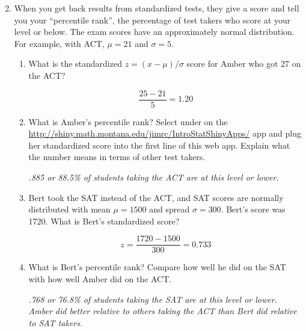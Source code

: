 \begin{enumerate}
\setcounter{enumi}{1}
  \item  When you get back results from standardized tests, they give
    a score and tell you your ``percentile rank'', the percentage
    of test takers who score at your level or below.  The exam scores have
    an approximately normal distribution.  For example, with ACT, $\mu
    = 21$ and $\sigma = 5$.
    \begin{enumerate}
    \item What is the standardized $z = (x-\mu)/\sigma$ score for
      Amber who got 27 on the ACT? 
\begin{students}
        \vspace{2cm}        
\end{students}
\begin{key}
  $$ \frac{25 - 21}{5} = 1.20$$
\end{key}
    \item What is Amber's percentile rank?  Select
       under  on the 
      \url{http://shiny.math.montana.edu/jimrc/IntroStatShinyApps/} 
      app and plug her standardized score  into
      the first line of this web app.  Explain what
      the number means in terms of other  test takers.  
\begin{students}
        \vspace{1cm}        
\end{students}

\begin{key}
 {\it .885 or 88.5\% of students taking the ACT are at this level or lower.}
\end{key}
   \item Bert took the SAT instead of the ACT, and
      SAT scores are normally distributed with mean $\mu = 1500$
     and spread $\sigma = 300$. Bert's score was  1720. What is Bert's
     standardized score?
\begin{students}
        \vspace{2cm}        
\end{students}
\begin{key}
  $$ z = \frac{1720 - 1500}{300} = 0.733$$
\end{key}
    \item What is Bert's percentile rank? Compare how well he did on
      the SAT with how well Amber did on the ACT. 
\begin{students}
        \vspace{2cm}        
\end{students}

\begin{key}
 {\it .768 or 76.8\% of students taking the SAT are at this level
    or lower.  Amber did better relative to others taking the ACT than
    Bert did relative to SAT takers.}
\end{key} 
  \end{enumerate}
\end{enumerate}

